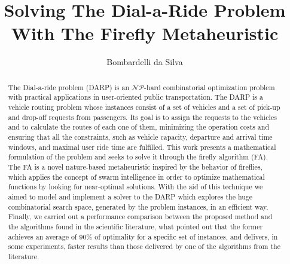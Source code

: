 \documentclass[tuberlin,cic,tc,openright,english,noabntcite,oneside]{iiufrgs}
\title{Solving The Dial-a-Ride Problem With The Firefly Metaheuristic}
\author{Bombardelli da Silva}{Fernando}
\begin{document}
\maketitle





\begin{abstract}
The Dial-a-ride problem (DARP) is an $\mathcal{NP}$-hard combinatorial optimization problem with practical applications in user-oriented public transportation. The DARP is a vehicle routing problem whose instances consist of a set of vehicles and a set of pick-up and drop-off requests from passengers. Its goal is to assign the requests to the vehicles and to calculate the routes of each one of them, minimizing the operation costs and ensuring that all the constraints, such as vehicle capacity, departure and arrival time windows, and maximal user ride time are fulfilled. This work presents a mathematical formulation of the problem and seeks to solve it through the firefly algorithm (FA). The FA is a novel nature-based metaheuristic inspired by the behavior of fireflies, which applies the concept of swarm intelligence in order to optimize mathematical functions by looking for near-optimal solutions. With the aid of this technique we aimed to model and implement a solver to the DARP which explores the huge combinatorial search space, generated by the problem instances, in an efficient way. Finally, we carried out a performance comparison between the proposed method and the algorithms found in the scientific literature, what pointed out that the former achieves an average of 90\% of optimality for a specific set of instances, and delivers, in some experiments, faster results than those delivered by one of the algorithms from the literature.
\end{abstract}
\end{document}
